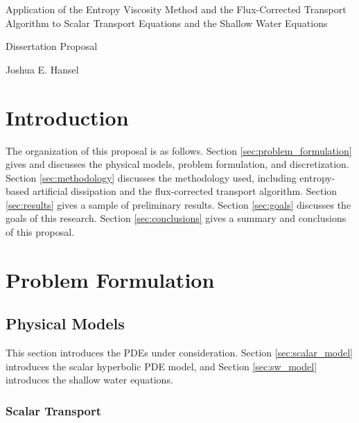 \documentclass[12pt]{article}
\newcommand{\contentdir}{../dissertation/content}
\begin{document}
\begin{center}
  {\large
    Application of the Entropy Viscosity Method and the Flux-Corrected Transport
    Algorithm to Scalar Transport Equations and the Shallow Water Equations
  }

  {\scriptsize
    Dissertation Proposal
  }

  \vspace{1em}

  Joshua E. Hansel
\end{center}

\section{Introduction}


The organization of this proposal is as follows.
Section \ref{sec:problem_formulation} gives and discusses the physical models,
problem formulation, and discretization.
Section \ref{sec:methodology} discusses the methodology used, including
entropy-based artificial dissipation and the flux-corrected transport
algorithm.
Section \ref{sec:results} gives a sample of preliminary results.
Section \ref{sec:goals} discusses the goals of this research.
Section \ref{sec:conclusions} gives a summary and conclusions of this proposal.

\section{Problem Formulation\label{sec:problem_formulation}}
\subsection{Physical Models}
This section introduces the PDEs under consideration. Section
\ref{sec:scalar_model} introduces the scalar hyperbolic PDE model, and
Section \ref{sec:sw_model} introduces the shallow water equations.
\subsubsection{Scalar Transport\label{sec:scalar_model}}

\end{document}
